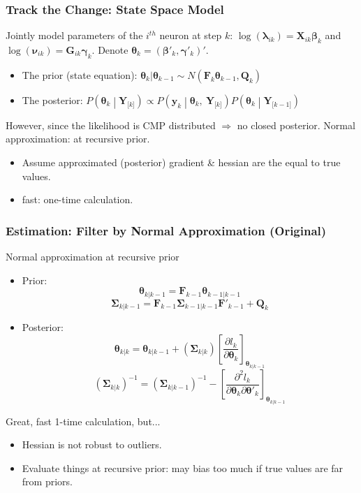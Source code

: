 \documentclass{beamer}
\begin{document}
	\begin{frame}
		\frametitle{Track the Change: State Space Model}
		Jointly model parameters of the $i^{th}$ neuron at step $k$: \(\log(\bm{\lambda}_{ik} ) = \bm{X}_{ik}\bm{\beta}_{k}\) and
		\(\log(\bm{\nu}_{ik}) = \bm{G}_{ik}\bm{\gamma}_{k}\). Denote \(\bm{\theta}_{k} = (\bm{\beta}'_{k},\bm{\gamma}'_{k})'\).
		\begin{itemize}
			\item 
			The prior (state equation): $\bm{\theta}_{k}|\bm{\theta}_{k-1}\sim N(\bm{F}_k\bm{\theta}_{k-1}, \bm{Q}_k)$
			\item
			The posterior:
			$P\left( \bm{\theta}_{k} \middle| \bm{Y}_{\lbrack k\rbrack} \right) \propto P\left( \bm{y}_{k} \middle| \bm{\theta}_{k},\ \bm{Y}_{\lbrack k\rbrack} \right)P\left( \bm{\theta}_{k} \middle| \bm{Y}_{\lbrack k - 1\rbrack} \right)$ 
		\end{itemize}
		However, since the likelihood is CMP distributed $\Rightarrow$ no closed posterior.
		Normal approximation: at recursive prior.
		\begin{itemize}
			\item 
			Assume approximated (posterior) gradient \& hessian are the equal to true values.
			\item
			fast: one-time calculation.
		\end{itemize}
	\end{frame}
	
	
	\begin{frame}
		\frametitle{Estimation: Filter by Normal Approximation (Original)}
		Normal approximation at recursive prior
		\begin{itemize}
			\item
			Prior:
			\[\bm{\theta}_{k|k - 1} = \bm{F}_{k - 1}\bm{\theta}_{k - 1|k - 1}\]
			\[\bm{\Sigma}_{k|k - 1} = \bm{F}_{k - 1}\bm{\Sigma}_{k - 1|k - 1}\bm{F}'_{k - 1} + \bm{Q}_{k}\]
			\item
			Posterior:
			\[\bm{\theta}_{k|k} = \bm{\theta}_{k|k - 1} + \left( \bm{\Sigma}_{k|k} \right)\left\lbrack \frac{\partial l_{k}}{\partial\bm{\theta}_{k}} \right\rbrack_{\bm{\theta}_{k|k - 1}}\]
			\[\left( \bm{\Sigma}_{k|k} \right)^{- 1} = \left( \bm{\Sigma}_{k|k - 1} \right)^{- 1} - \left\lbrack \frac{\partial^{2}l_{k}}{\partial\bm{\theta}_{k}\partial\bm{\theta}'_{k}} \right\rbrack_{\bm{\theta}_{k|k - 1}}\]
		\end{itemize}
		Great, fast 1-time calculation, but...
		\begin{itemize}
			\item
			Hessian is not robust to outliers.
			\item
			Evaluate things at recursive prior: may bias too much if true values are far from priors.
		\end{itemize}
	\end{frame}
	
\end{document}
